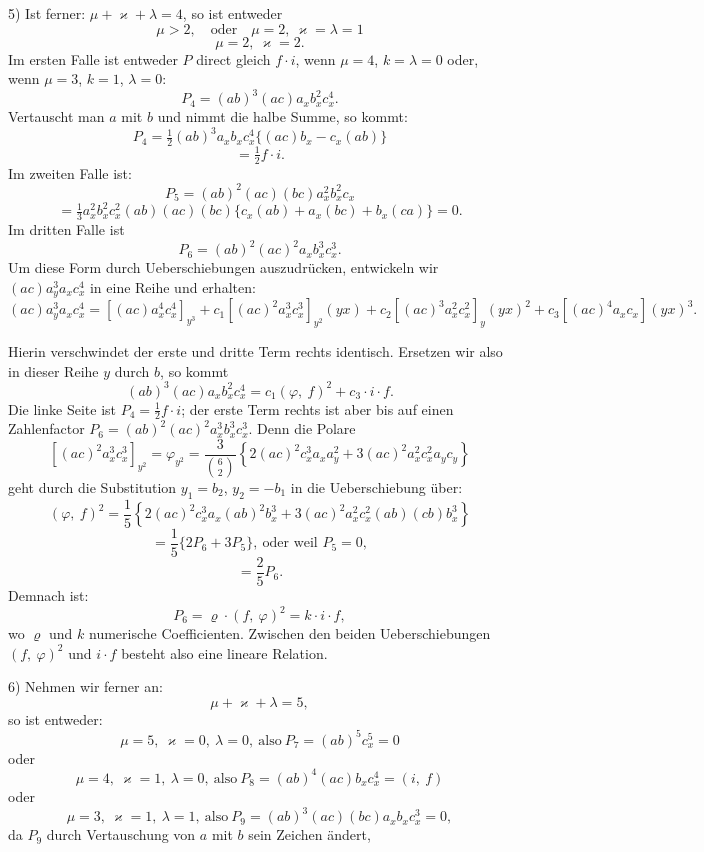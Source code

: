 5) Ist ferner: $\mu + \varkappa + \lambda = 4$, so ist entweder
\[
\mu > 2,\quad \text{oder}\quad \mu = 2,\ \varkappa = \lambda = 1
\]
\[
\mu = 2,\ \varkappa = 2.
\]
Im ersten Falle ist entweder $P$ direct gleich $f \cdot i$, wenn $\mu = 4$, $k = \lambda = 0$ %
oder, wenn $\mu = 3$, $k = 1$, $\lambda = 0$: %
\[
P_4 = (ab)^3 (ac) a_x b_x^2 c_x^4.
\]
Vertauscht man $a$ mit $b$ und nimmt die halbe Summe, so kommt:
\[
P_4 = \tfrac{1}{2} (ab)^3 a_x b_x c_x^4 \{(ac) b_x - c_x (ab)\}
\]
\[
= \tfrac{1}{2} f \cdot i.
\]
Im zweiten Falle ist:
\[
P_5 = (ab)^2 (ac) (bc) a_x^2 b_x^2 c_x
\]
\[
= \tfrac{1}{3} a_x^2 b_x^2 c_x^2 (ab)(ac)(bc) \{c_x (ab) + a_x (bc) + b_x (ca)\} = 0.
\]
Im dritten Falle ist
\[
P_6 = (ab)^2 (ac)^2 a_x b_x^3 c_x^3.
\]
Um diese Form durch Ueberschiebungen auszudrücken, entwickeln wir $(ac) a_y^3 a_x c_x^4$ in eine Reihe und erhalten:
\[
(ac) a_y^3 a_x c_x^4 = [(ac) a_x^4 c_x^4]_{y^3} + c_1 [(ac)^2 a_x^3 c_x^3]_{y^2} (yx) + c_2 [(ac)^3 a_x^2 c_x^2]_y (yx)^2 + c_3 [(ac)^4 a_x c_x] (yx)^3.
\]


Hierin verschwindet der erste und dritte Term rechts identisch. Ersetzen wir also in dieser Reihe $y$ durch $b$, so kommt
\[
(ab)^3 (ac) a_x b_x^2 c_x^4 = c_1 (\varphi,\ f)^2 + c_3 \cdot i \cdot f.
\]
Die linke Seite ist $P_4 = \tfrac{1}{2} f \cdot i$; der erste Term rechts ist aber bis auf einen Zahlenfactor $P_6 = (ab)^2 (ac)^2 a_x^3 b_x^3 c_x^3$. Denn die Polare
\[
[(ac)^2 a_x^3 c_x^3]_{y^2} = \varphi_{y^2} = \frac{3}{\binom{6}{2}} \left\{ 2 (ac)^2 c_x^3 a_x a_y^2 + 3 (ac)^2 a_x^2 c_x^2 a_y c_y \right\}
\]
geht durch die Substitution $y_1 = b_2$, $y_2 = -b_1$ in die Ueberschiebung über:
\[
(\varphi,\ f)^2 = \frac{1}{5} \left\{ 2 (ac)^2 c_x^3 a_x (ab)^2 b_x^3 + 3 (ac)^2 a_x^2 c_x^2 (ab)(cb) b_x^3 \right\}
\]
\[
= \frac{1}{5} \{ 2 P_6 + 3 P_5 \},\ \text{oder weil } P_5 = 0,
\]
\[
= \frac{2}{5} P_6.
\]
Demnach ist:
\[
P_6 = \varrho \cdot (f,\ \varphi)^2 = k \cdot i \cdot f,
\]
wo $\varrho$ und $k$ numerische Coefficienten. Zwischen den beiden Ueberschiebungen $(f,\ \varphi)^2$ und $i \cdot f$ besteht also eine lineare Relation.

6) Nehmen wir ferner an:
\[
\mu + \varkappa + \lambda = 5,
\]
so ist entweder:
\[
\mu = 5,\ \varkappa = 0,\ \lambda = 0,\ \text{also}\ P_7 = (ab)^5 c_x^5 = 0
\]
oder
\[
\mu = 4,\ \varkappa = 1,\ \lambda = 0,\ \text{also}\ P_8 = (ab)^4 (ac) b_x c_x^4 = (i,\ f)
\]
oder
\[
\mu = 3,\ \varkappa = 1,\ \lambda = 1,\ \text{also}\ P_9 = (ab)^3 (ac) (bc) a_x b_x c_x^3 = 0,
\]
da $P_9$ durch Vertauschung von $a$ mit $b$ sein Zeichen ändert,

